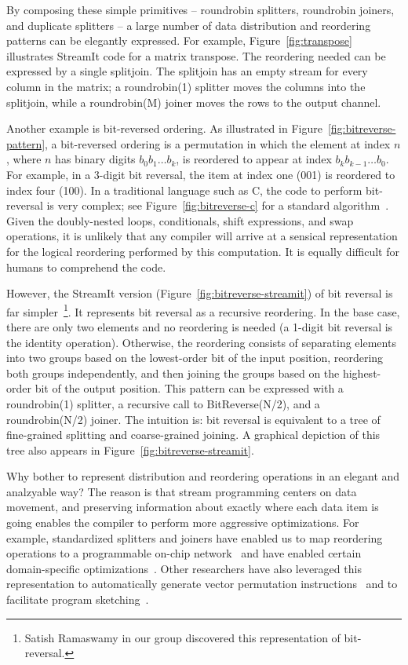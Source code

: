 By composing these simple primitives -- roundrobin splitters,
roundrobin joiners, and duplicate splitters -- a large number of data
distribution and reordering patterns can be elegantly expressed.  For
example, Figure~\ref{fig:transpose} illustrates StreamIt code for a
matrix transpose.  The reordering needed can be expressed by a single
splitjoin.  The splitjoin has an empty stream for every column in the
matrix; a roundrobin(1) splitter moves the columns into the splitjoin,
while a roundrobin(M) joiner moves the rows to the output channel.

Another example is bit-reversed ordering.  As illustrated in
Figure~\ref{fig:bitreverse-pattern}, a bit-reversed ordering is a
permutation in which the element at index $n$, where $n$ has binary
digits $b_0b_1 \dots b_k$, is reordered to appear at index $b_kb_{k-1}
\dots b_0$.  For example, in a 3-digit bit reversal, the item at index
one (001) is reordered to index four (100).  In a traditional language
such as C, the code to perform bit-reversal is very complex; see
Figure~\ref{fig:bitreverse-c} for a standard
algorithm~\cite{press_numerical_1992}.  Given the doubly-nested loops,
conditionals, shift expressions, and swap operations, it is unlikely
that any compiler will arrive at a sensical representation for the
logical reordering performed by this computation.  It is equally
difficult for humans to comprehend the code.

However, the StreamIt version (Figure~\ref{fig:bitreverse-streamit})
of bit reversal is far simpler~\footnote{Satish Ramaswamy in our group
  discovered this representation of bit-reversal.}.  It represents bit
reversal as a recursive reordering.  In the base case, there are only
two elements and no reordering is needed (a 1-digit bit reversal is
the identity operation).  Otherwise, the reordering consists of
separating elements into two groups based on the lowest-order bit of
the input position, reordering both groups independently, and then
joining the groups based on the highest-order bit of the output
position.  This pattern can be expressed with a roundrobin(1)
splitter, a recursive call to BitReverse(N/2), and a roundrobin(N/2)
joiner.  The intuition is: bit reversal is equivalent to a tree of
fine-grained splitting and coarse-grained joining.  A graphical
depiction of this tree also appears in
Figure~\ref{fig:bitreverse-streamit}.

Why bother to represent distribution and reordering operations in an
elegant and analzyable way?  The reason is that stream programming
centers on data movement, and preserving information about exactly
where each data item is going enables the compiler to perform more
aggressive optimizations.  For example, standardized splitters and
joiners have enabled us to map reordering operations to a programmable
on-chip network~\cite{streamit-asplos} and have enabled certain
domain-specific
optimizations~\cite{lamb-pldi03,agrawal-cases05,techreport}.
Other researchers have also leveraged this representation to
automatically generate vector permutation
instructions~\cite{mani-permutations} and to facilitate program
sketching~\cite{bit-streaming}.

